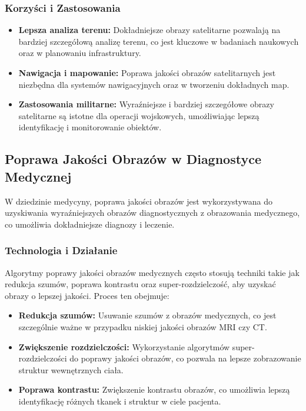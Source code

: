 \documentclass[10pt]{article}
\begin{document}
\subsubsection*{Korzyści i Zastosowania}

\begin{itemize}
    \item \textbf{Lepsza analiza terenu:} Dokładniejsze obrazy satelitarne pozwalają na bardziej szczegółową analizę terenu, co jest kluczowe w badaniach naukowych oraz w planowaniu infrastruktury.
    \item \textbf{Nawigacja i mapowanie:} Poprawa jakości obrazów satelitarnych jest niezbędna dla systemów nawigacyjnych oraz w tworzeniu dokładnych map.
    \item \textbf{Zastosowania militarne:} Wyraźniejsze i bardziej szczegółowe obrazy satelitarne są istotne dla operacji wojskowych, umożliwiając lepszą identyfikację i monitorowanie obiektów.
\end{itemize}

\subsection*{Poprawa Jakości Obrazów w Diagnostyce Medycznej}

W dziedzinie medycyny, poprawa jakości obrazów jest wykorzystywana do uzyskiwania wyraźniejszych obrazów diagnostycznych z obrazowania medycznego, co umożliwia dokładniejsze diagnozy i leczenie.

\subsubsection*{Technologia i Działanie}

Algorytmy poprawy jakości obrazów medycznych często stosują techniki takie jak redukcja szumów, poprawa kontrastu oraz super-rozdzielczość, aby uzyskać obrazy o lepszej jakości. Proces ten obejmuje:

\begin{itemize}
    \item \textbf{Redukcja szumów:} Usuwanie szumów z obrazów medycznych, co jest szczególnie ważne w przypadku niskiej jakości obrazów MRI czy CT.
    \item \textbf{Zwiększenie rozdzielczości:} Wykorzystanie algorytmów super-rozdzielczości do poprawy jakości obrazów, co pozwala na lepsze zobrazowanie struktur wewnętrznych ciała.
    \item \textbf{Poprawa kontrastu:} Zwiększenie kontrastu obrazów, co umożliwia lepszą identyfikację różnych tkanek i struktur w ciele pacjenta.
\end{itemize}
\end{document}
